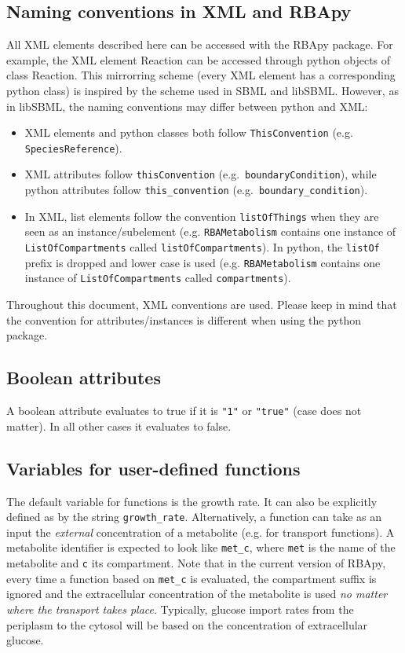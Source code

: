 \documentclass[12pt]{scrartcl}
\begin{document}
\subsection{Naming conventions in XML and RBApy}

All XML elements described here can be accessed with the RBApy package.
For example, the XML element Reaction can be accessed through python objects
of class Reaction.
This mirrorring scheme (every XML element has a corresponding python class) is
inspired by the scheme used in SBML and libSBML.
However, as in libSBML, the naming conventions may differ between python and XML:

\begin{itemize}
  \item XML elements and python classes both follow \texttt{ThisConvention} (e.g. \texttt{SpeciesReference}).
  \item XML attributes follow \texttt{thisConvention} (e.g.\ \texttt{boundaryCondition}), while
    python attributes follow \texttt{this\_convention} (e.g.\ \texttt{boundary\_condition}).
  \item In XML, list elements follow the convention \texttt{listOfThings}
    when they are seen as an instance/subelement
    (e.g. \texttt{RBAMetabolism} contains one instance of \texttt{ListOfCompartments} called \texttt{listOfCompartments}).
    In python, the \texttt{listOf} prefix is dropped and lower case is used
    (e.g. \texttt{RBAMetabolism} contains one instance of \texttt{ListOfCompartments} called \texttt{compartments}).
\end{itemize}

Throughout this document, XML conventions are used.
Please keep in mind that the convention for attributes/instances is different when using the
python package.

\subsection{Boolean attributes}

A boolean attribute evaluates to true if it is \texttt{"1"}
or \texttt{"true"} (case does not matter).
In all other cases it evaluates to false.

\subsection{Variables for user-defined functions}

The default variable for functions is the growth rate.
It can also be explicitly defined as by the string \texttt{growth\_rate}.
Alternatively, a function can take as an input the \emph{external}
concentration of a metabolite (e.g. for transport functions).
A metabolite identifier is expected to look like \texttt{met\_c},
where \texttt{met} is the name of the metabolite
and \texttt{c} its compartment.
Note that in the current version of RBApy,
every time a function based on \texttt{met\_c} is evaluated,
the compartment suffix is ignored and the extracellular concentration of the metabolite is used
\emph{no matter where the transport takes place}.
Typically, glucose import rates from the periplasm to the cytosol
will be based on the concentration of extracellular glucose.








\end{document}
